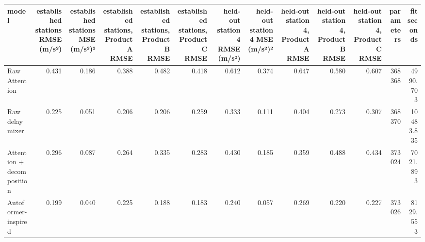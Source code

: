 \begin{tabular}{lrrrrrrrrrrrr}
\toprule
model & established stations RMSE (m/s²) & established stations MSE (m/s²)² & established stations, Product A RMSE & established stations, Product B RMSE & established stations, Product C RMSE & held-out station 4 RMSE (m/s²) & held-out station 4 MSE (m/s²)² & held-out station 4, Product A RMSE & held-out station 4, Product B RMSE & held-out station 4, Product C RMSE & parameters & fit seconds \\
\midrule
Raw Attention & 0.431 & 0.186 & 0.388 & 0.482 & 0.418 & 0.612 & 0.374 & 0.647 & 0.580 & 0.607 & 368368 & 4990.703 \\
Raw delay mixer & 0.225 & 0.051 & 0.206 & 0.206 & 0.259 & 0.333 & 0.111 & 0.404 & 0.273 & 0.307 & 368370 & 10483.835 \\
Attention + decomposition & 0.296 & 0.087 & 0.264 & 0.335 & 0.283 & 0.430 & 0.185 & 0.359 & 0.488 & 0.434 & 373024 & 7021.893 \\
Autoformer-inspired & 0.199 & 0.040 & 0.225 & 0.188 & 0.183 & 0.240 & 0.057 & 0.269 & 0.220 & 0.227 & 373026 & 8129.553 \\
\bottomrule
\end{tabular}
